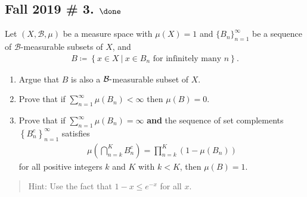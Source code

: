 \begin{solution}
\end{solution}

\hypertarget{fall-2019-3.-done}{%
\subsection{\texorpdfstring{Fall 2019 \# 3.
\(\done\)}{Fall 2019 \# 3. \textbackslash done}}\label{fall-2019-3.-done}}

Let \((X, \mathcal B, \mu)\) be a measure space with \(\mu(X) = 1\) and
\(\{B_n\}_{n=1}^\infty\) be a sequence of \(\mathcal B\)-measurable
subsets of \(X\), and
\begin{align*}
B \coloneqq\left\{{x\in X {~\mathrel{\Big|}~}x\in B_n \text{ for infinitely many } n}\right\}.
\end{align*}

\begin{enumerate}
\def\labelenumi{\alph{enumi}.}
\item
  Argue that \(B\) is also a \(\mathcal{B} {\hbox{-}}\)measurable subset
  of \(X\).
\item
  Prove that if \(\sum_{n=1}^\infty \mu(B_n) < \infty\) then
  \(\mu(B)= 0\).
\item
  Prove that if \(\sum_{n=1}^\infty \mu(B_n) = \infty\) \textbf{and} the
  sequence of set complements \(\left\{{B_n^c}\right\}_{n=1}^\infty\)
  satisfies
  \begin{align*}
  \mu\left(\bigcap_{n=k}^{K} B_{n}^{c}\right)=\prod_{n=k}^{K}\left(1-\mu\left(B_{n}\right)\right)
  \end{align*}
  for all positive integers \(k\) and \(K\) with \(k < K\), then
  \(\mu(B) = 1\).
\end{enumerate}

\begin{quote}
Hint: Use the fact that \(1 - x ≤ e^{-x}\) for all \(x\).
\end{quote}

